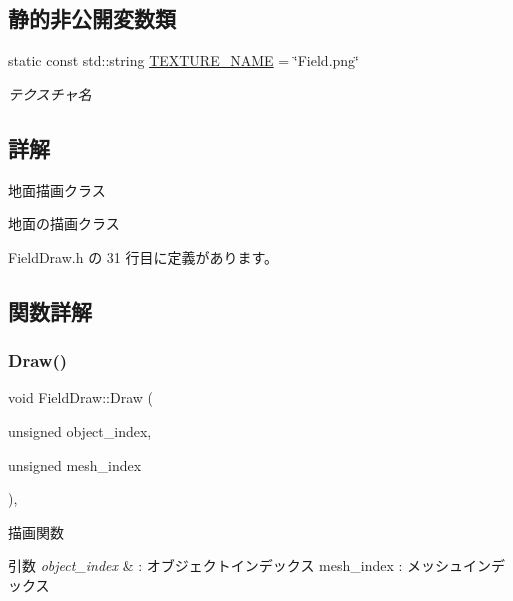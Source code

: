 \subsection*{静的非公開変数類}
\begin{DoxyCompactItemize}
\item 
static const std\+::string \mbox{\hyperlink{class_field_draw_a0100eac615b34df95aaf3627182fb9f1}{T\+E\+X\+T\+U\+R\+E\+\_\+\+N\+A\+ME}} = \char`\"{}Field.\+png\char`\"{}
\begin{DoxyCompactList}\small\item\em テクスチャ名 \end{DoxyCompactList}\end{DoxyCompactItemize}


\subsection{詳解}
地面描画クラス 

地面の描画クラス 

 Field\+Draw.\+h の 31 行目に定義があります。



\subsection{関数詳解}
\mbox{\label{class_field_draw_a1915497654d079074dbd3e058db06a78}} 
\subsubsection{\texorpdfstring{Draw()}{Draw()}}
{\footnotesize\ttfamily void Field\+Draw\+::\+Draw (\begin{DoxyParamCaption}\item[{unsigned}]{object\+\_\+index,  }\item[{unsigned}]{mesh\+\_\+index }\end{DoxyParamCaption})\hspace{0.3cm}{\ttfamily [override]}, {\ttfamily [virtual]}}



描画関数 


\begin{DoxyParams}{引数}
{\em object\+\_\+index} & \+: オブジェクトインデックス mesh\+\_\+index \+: メッシュインデックス \\
\hline
\end{DoxyParams}


